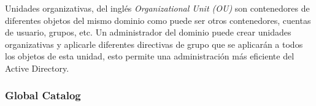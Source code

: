 Unidades organizativas, del inglés {\it Organizational Unit (OU)} son contenedores de diferentes objetos del mismo dominio como puede ser otros contenedores, cuentas de usuario, grupos, etc. Un administrador del dominio puede crear unidades organizativas y aplicarle diferentes directivas de grupo que se aplicarán a todos los objetos de esta unidad, esto permite una administración más eficiente del Active Directory. 

\subsubsection{Global Catalog}

